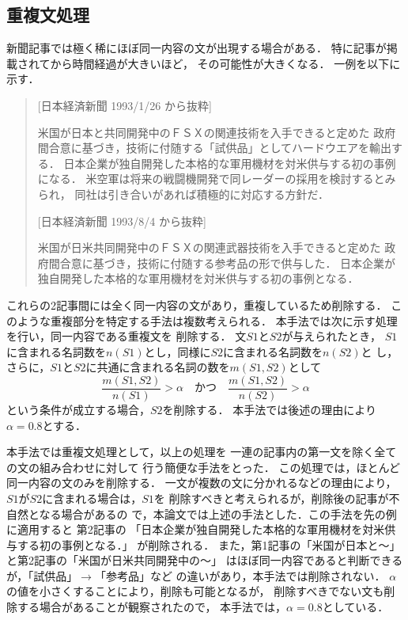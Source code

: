 \subsection{重複文処理}
\label{重複文処理}
新聞記事では極く稀にほぼ同一内容の文が出現する場合がある．
特に記事が掲載されてから時間経過が大きいほど，
その可能性が大きくなる．
一例を以下に示す．
\begin{quote}
[日本経済新聞 1993/1/26 から抜粋]

米国が日本と共同開発中のＦＳＸの関連技術を入手できると定めた
政府間合意に基づき，技術に付随する「試供品」としてハードウエアを輸出する．
日本企業が独自開発した本格的な軍用機材を対米供与する初の事例になる．
米空軍は将来の戦闘機開発で同レーダーの採用を検討するとみられ，
同社は引き合いがあれば積極的に対応する方針だ．

[日本経済新聞 1993/8/4 から抜粋]

米国が日米共同開発中のＦＳＸの関連武器技術を入手できると定めた
政府間合意に基づき，技術に付随する参考品の形で供与した．
日本企業が独自開発した本格的な軍用機材を対米供与する初の事例となる．
\end{quote}

これらの2記事間には全く同一内容の文があり，重複しているため削除する．
このような重複部分を特定する手法は複数考えられる．
本手法では次に示す処理を行い，\mbox{同一内容である重複}文を
削除する．
文$S1とS2$が与えられたとき，
$S1$に含まれる名詞数を$n(S1)$とし，同様に$S2$に含まれる名詞数を$n(S2)$と
し，さらに，$S1とS2$に共通に含まれる名詞の数を$m(S1,S2)$として
\[
 \frac{m(S1,S2) }{n(S1)} > \alpha \quad かつ \quad \frac{m(S1,S2) }{n(S2)} > \alpha
\]
という条件が成立する場合，$S2$を削除する．
本手法では後述の理由により$\alpha=0.8$とする．

本手法では重複文処理として，以上の処理を
一連の記事内の第一文を除く全ての文の組み合わせに対して
行う簡便な手法をとった．
この処理では，ほとんど同一内容の文のみを削除する．
一文が複数の文に分かれるなどの理由により，
$S1$が$S2$に含まれる場合は，$S1$を
削除すべきと考えられるが，削除後の記事が不自然となる場合があるの
で，本論文では上述の手法とした．この手法を先の例に適用すると
第2記事の
「日本企業が独自開発した本格的な軍用機材を対米供与する初の事例となる．」
が削除される．
また，第1記事の「米国が日本と〜」と第2記事の「米国が日米共同開発中の〜」
はほぼ同一内容であると判断できるが，「試供品」$\rightarrow$「参考品」など
の違いがあり，本手法では削除されない．
$\alpha$の値を小さくすることにより，削除も\mbox{可能となる}が，
削除すべきでない文も削除する場合があることが観察されたので，
本手法では，$\alpha=0.8$としている．

